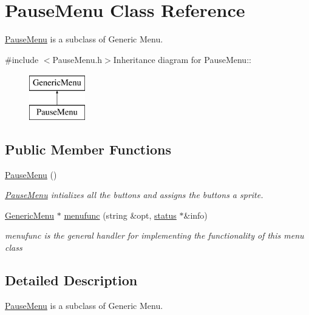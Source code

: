 \hypertarget{classPauseMenu}{
\section{PauseMenu Class Reference}
\label{classPauseMenu}
}


\hyperlink{classPauseMenu}{PauseMenu} is a subclass of Generic Menu.  


{\ttfamily \#include $<$PauseMenu.h$>$}Inheritance diagram for PauseMenu::\begin{figure}[H]
\begin{center}
\leavevmode
\includegraphics[height=2cm]{classPauseMenu}
\end{center}
\end{figure}
\subsection*{Public Member Functions}
\begin{DoxyCompactItemize}
\item 
\hypertarget{classPauseMenu_ae7b38f4044988404e1502245ee7438d3}{
\hyperlink{classPauseMenu_ae7b38f4044988404e1502245ee7438d3}{PauseMenu} ()}
\label{classPauseMenu_ae7b38f4044988404e1502245ee7438d3}

\begin{DoxyCompactList}\small\item\em \hyperlink{classPauseMenu}{PauseMenu} intializes all the buttons and assigns the buttons a sprite. \item\end{DoxyCompactList}\item 
\hyperlink{classGenericMenu}{GenericMenu} $\ast$ \hyperlink{classPauseMenu_a7926ffe9dd0aa74281d8cb8126cd9c10}{menufunc} (string \&opt, \hyperlink{classstatus}{status} $\ast$\&info)
\begin{DoxyCompactList}\small\item\em menufunc is the general handler for implementing the functionality of this menu class \item\end{DoxyCompactList}\end{DoxyCompactItemize}


\subsection{Detailed Description}
\hyperlink{classPauseMenu}{PauseMenu} is a subclass of Generic Menu. 

